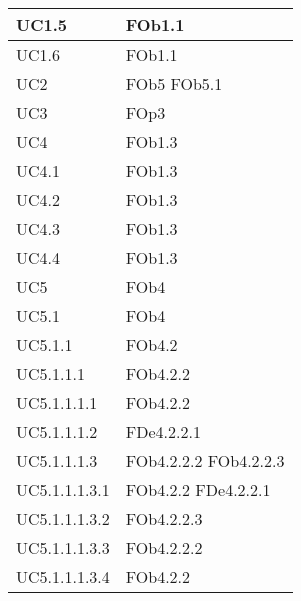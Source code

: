 \begin{longtable}{|l|p{4cm}|}
\hline
		UC1.5 & FOb1.1 \linebreak   \\
\hline
		UC1.6 & FOb1.1 \linebreak   \\
\hline
		UC2 & FOb5 \linebreak  FOb5.1 \linebreak   \\
\hline
		UC3 & FOp3 \linebreak   \\
\hline
		UC4 & FOb1.3 \linebreak   \\
\hline
		UC4.1 & FOb1.3 \linebreak   \\
\hline
		UC4.2 & FOb1.3 \linebreak   \\
\hline
		UC4.3 & FOb1.3 \linebreak   \\
\hline
		UC4.4 & FOb1.3 \linebreak   \\
\hline
		UC5 & FOb4 \linebreak   \\
\hline
		UC5.1 & FOb4 \linebreak   \\
\hline
		UC5.1.1 & FOb4.2 \linebreak   \\
\hline
		UC5.1.1.1 & FOb4.2.2 \linebreak   \\
\hline
		UC5.1.1.1.1 & FOb4.2.2 \linebreak   \\
\hline
		UC5.1.1.1.2 & FDe4.2.2.1 \linebreak   \\
\hline
		UC5.1.1.1.3 & FOb4.2.2.2 \linebreak  FOb4.2.2.3 \linebreak   \\
\hline
		UC5.1.1.1.3.1 & FOb4.2.2 \linebreak  FDe4.2.2.1 \linebreak   \\
\hline
		UC5.1.1.1.3.2 & FOb4.2.2.3 \linebreak   \\
\hline
		UC5.1.1.1.3.3 & FOb4.2.2.2 \linebreak   \\
\hline
		UC5.1.1.1.3.4 & FOb4.2.2 \linebreak   \\

\end{longtable}
